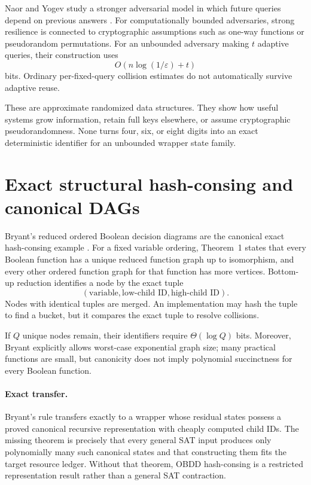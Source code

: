 \documentclass[11pt]{article}
\begin{document}
Naor and Yogev study a stronger adversarial model in which future queries
depend on previous answers \cite{naoryogev2019}.  For computationally bounded
adversaries, strong resilience is connected to cryptographic assumptions
such as one-way functions or pseudorandom permutations.  For an unbounded
adversary making $t$ adaptive queries, their construction uses
\[
 O\!\left(n\log(1/\varepsilon)+t\right)
\]
bits.  Ordinary per-fixed-query collision estimates do not automatically
survive adaptive reuse.

These are approximate randomized data structures.  They show how useful
systems grow information, retain full keys elsewhere, or assume
cryptographic pseudorandomness.  None turns four, six, or eight digits into
an exact deterministic identifier for an unbounded wrapper state family.

\section{Exact structural hash-consing and canonical DAGs}

Bryant's reduced ordered Boolean decision diagrams are the canonical exact
hash-consing example \cite{bryant1986}.  For a fixed variable ordering,
Theorem~1 states that every Boolean function has a unique reduced function
graph up to isomorphism, and every other ordered function graph for that
function has more vertices.  Bottom-up reduction identifies a node by the
exact tuple
\[
  (\text{variable},\text{low-child ID},\text{high-child ID}).
 \tag{10}
\]
Nodes with identical tuples are merged.  An implementation may hash the tuple
to find a bucket, but it compares the exact tuple to resolve collisions.

If $Q$ unique nodes remain, their identifiers require $\Theta(\log Q)$ bits.
Moreover, Bryant explicitly allows worst-case exponential graph size; many
practical functions are small, but canonicity does not imply polynomial
succinctness for every Boolean function.

\paragraph{Exact transfer.}
Bryant's rule transfers exactly to a wrapper whose residual states possess a
proved canonical recursive representation with cheaply computed child IDs.
The missing theorem is precisely that every general SAT input produces only
polynomially many such canonical states and that constructing them fits the
target resource ledger.  Without that theorem, OBDD hash-consing is a
restricted representation result rather than a general SAT contraction.
\end{document}
